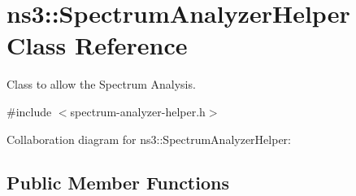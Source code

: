 \hypertarget{classns3_1_1SpectrumAnalyzerHelper}{}\section{ns3\+:\+:Spectrum\+Analyzer\+Helper Class Reference}
\label{classns3_1_1SpectrumAnalyzerHelper}


Class to allow the Spectrum Analysis.  




{\ttfamily \#include $<$spectrum-\/analyzer-\/helper.\+h$>$}



Collaboration diagram for ns3\+:\+:Spectrum\+Analyzer\+Helper\+:
\subsection*{Public Member Functions}
